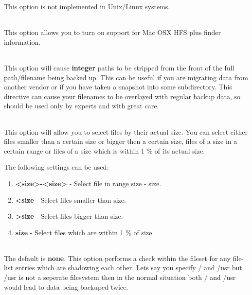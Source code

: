 \begin{description}
   This option is not implemented in Unix/Linux systems.

\item [hfsplussupport=yes{\textbar}no] \hfill \\
   This option allows you to turn on support for Mac OSX HFS plus
   finder information.

\item [strippath={\textless}integer{\textgreater}] \hfill \\
   This option will cause {\bf integer} paths to be stripped from
   the front of the full path/filename being backed up. This can
   be useful if you are migrating data from another vendor or if
   you have taken a snapshot into some subdirectory.  This directive
   can cause your filenames to be overlayed with regular backup data,
   so should be used only by experts and with great care.

\item [size=sizeoption] \hfill \\
   This option will allow you to select files by their actual size.
   You can select either files smaller than a certain size or bigger
   then a certain size, files of a size in a certain range or files
   of a size which is within 1 \% of its actual size.

   The following settings can be used:

   \begin{enumerate}
   \item {\bf {\textless}size{\textgreater}-{\textless}size{\textgreater}} - Select file in range size - size.
   \item {\bf {\textless}size} - Select files smaller than size.
   \item {\bf {\textgreater}size} - Select files bigger than size.
   \item {\bf size} - Select files which are within 1 \% of size.
   \end{enumerate}

\item [shadowing=none{\textbar}localwarn{\textbar}localremove{\textbar}globalwarn{\textbar}globalremove] \hfill \\
   The default is {\bf none}. This option performs a check within the
   fileset for any file-list entries which are shadowing each other.
   Lets say you specify / and /usr but /usr is not a seperate filesystem
   then in the normal situation both / and /usr would lead to data being
   backuped twice.


\end{description}
